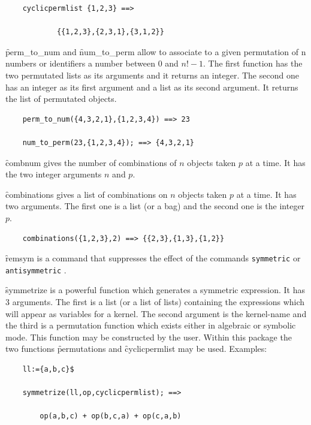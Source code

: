 \begin{itemize}
\begin{verbatim}
    cyclicpermlist {1,2,3} ==>

            {{1,2,3},{2,3,1},{3,1,2}}
\end{verbatim}
\hypertarget{operator:PERM_TO_NUM}{}
\hypertarget{operator:NUM_TO_PERM}{}
\f{perm\_to\_num} and \f{num\_to\_perm} allow to associate to a given
permutation of n numbers or identifiers a number between $0$ and
$n! - 1$. The first function has the two permutated lists
as its arguments and it returns an integer. The second one has an integer
as its first argument and a list as its second argument. It returns the
list of permutated objects.
\begin{verbatim}
    perm_to_num({4,3,2,1},{1,2,3,4}) ==> 23

    num_to_perm(23,{1,2,3,4}); ==> {4,3,2,1}
\end{verbatim}
\hypertarget{operator:COMBNUM}{}
\f{combnum} gives the number of combinations of $n$ objects
taken $p$ at a time. It has the two integer arguments $n$ and $p$.

\hypertarget{operator:COMBINATIONS}{}
\f{combinations} gives a list of combinations on $n$ objects taken $p$
at a time. It has two arguments. The first one is a list (or a bag) and
the second one is the integer $p$.
\begin{verbatim}
    combinations({1,2,3},2) ==> {{2,3},{1,3},{1,2}}
\end{verbatim}
\f{remsym} is a command that suppresses the effect of the \REDUCE commands
\texttt{symmetric} or \texttt{antisymmetric} .

\hypertarget{operator:SYMMETRIZE}{}
\f{symmetrize} is a powerful function which generates a symmetric expression.
It has 3 arguments. The first is a list (or a list of lists) containing
the expressions which will appear as variables for a kernel. The second
argument is the kernel-name and the third is a permutation function
which exists either in algebraic or symbolic mode. This
function may be constructed by the user. Within this package
the two functions \f{permutations} and \f{cyclicpermlist} may be used.
Examples:
\begin{verbatim}
    ll:={a,b,c}$

    symmetrize(ll,op,cyclicpermlist); ==>

        op(a,b,c) + op(b,c,a) + op(c,a,b)


\end{verbatim}
\end{itemize}
